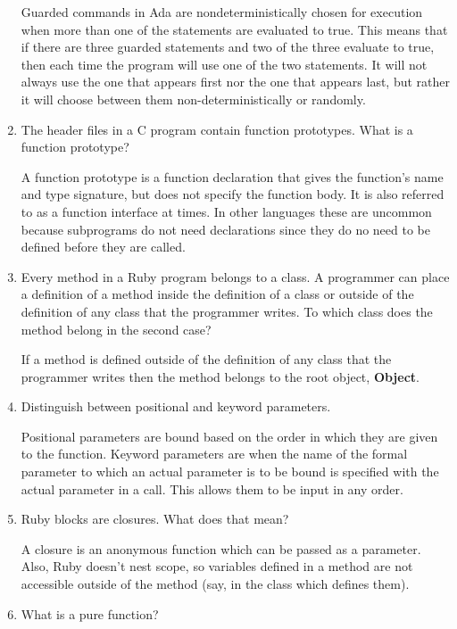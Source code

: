 \begin{enumerate}
    Guarded commands in Ada are nondeterministically chosen for execution when more than one of the statements are evaluated to true. This means that if there are three guarded statements and two of the three evaluate to true, then each time the program will use one of the two statements. It will not always use the one that appears first nor the one that appears last, but rather it will choose between them non-deterministically or randomly.


  \item The header files in a C program contain function
    prototypes. What is a function prototype?
    
    A function prototype is a function declaration that gives the function's name and type signature, but does not specify the function body. It is also referred to as a function interface at times. In other languages these are uncommon because subprograms do not need declarations since they do no need to be defined before they are called. 


  \item Every method in a Ruby program belongs to a class.
    A programmer can place a definition of a method inside
    the definition of a class or outside of the definition
    of any class that the programmer writes. To which class
    does the method belong in the second case?
    
    If a method is defined outside of the definition of any class that the programmer writes then the method belongs to the root object, \textbf{Object}. 

  \item Distinguish between positional and keyword parameters.
  
  Positional parameters are bound based on the order in which they are given to the function. Keyword parameters are when the name of the formal parameter to which an actual parameter is to be bound is specified with the actual parameter in a call. This allows them to be input in any order.


  \item Ruby blocks are closures. What does that mean?
  
  A closure is an anonymous function which can be passed as a parameter. Also, Ruby doesn't nest scope, so variables defined in a method are not accessible outside of the method (say, in the class which defines them).


  \item What is a pure function?


\end{enumerate}

